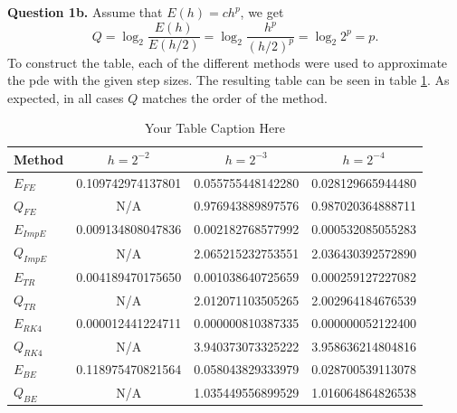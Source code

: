 \documentclass[letterpaper, reqno,11pt]{article}
\begin{document}
{\medskip\noindent\bf Question 1b.} Assume that $E(h)=ch^{p}$, we get
\[
Q=\log_2 \frac{E(h)}{E(h /2)}=\log_2 \frac{h^{p}}{(h /2)^{p}}=\log_2 2^{p}=p
.\]
To construct the table, each of the different methods were used to approximate the pde with the given step sizes. The resulting table can be seen in table \ref{tab:q1b}. As expected, in all cases $Q$ matches the order of the method.

\begin{table}
    \centering
    \begin{tabular}{|l|c|c|c|}
        \hline
        Method & $h = 2^{-2}$ & $h = 2^{-3}$ & $h = 2^{-4}$ \\
        \hline
        $E_{FE}$   & 0.109742974137801 & 0.055755448142280 & 0.028129665944480 \\
        $Q_{FE}$   & N/A                & 0.976943889897576 & 0.987020364888711 \\
        $E_{ImpE}$ & 0.009134808047836 & 0.002182768577992 & 0.000532085055283 \\
        $Q_{ImpE}$ & N/A                & 2.065215232753551 & 2.036430392572890 \\
        $E_{TR}$   & 0.004189470175650 & 0.001038640725659 & 0.000259127227082 \\
        $Q_{TR}$   & N/A                & 2.012071103505265 & 2.002964184676539 \\
        $E_{RK4}$  & 0.000012441224711 & 0.000000810387335 & 0.000000052122400 \\
        $Q_{RK4}$  & N/A                & 3.940373073325222 & 3.958636214804816 \\
        $E_{BE}$   & 0.118975470821564 & 0.058043829333979 & 0.028700539113078 \\
        $Q_{BE}$   & N/A                & 1.035449556899529 & 1.016064864826538 \\
        \hline
    \end{tabular}
    \caption{Your Table Caption Here}
    \label{tab:q1b}
\end{table}
\end{document}
